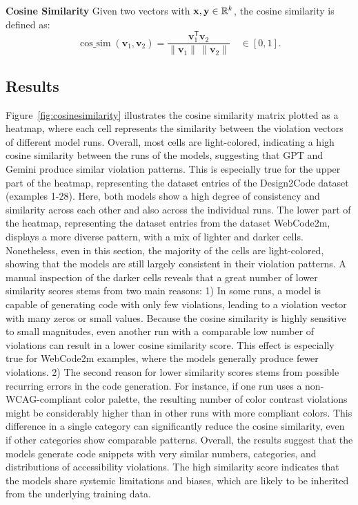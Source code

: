 \textbf{Cosine Similarity}  
  Given two vectors with $\mathbf x,\mathbf y\in\mathbb R^{k}$, the cosine similarity is defined as:
  \[
  \operatorname{cos\_sim}(\mathbf v_1,\mathbf v_2)=
  \frac{\mathbf v_1^{\mathsf T}\mathbf v_2}{\lVert \mathbf v_1\rVert\,\lVert \mathbf v_2\rVert}
  \quad\in[0,1].
\]


\subsection{Results}
Figure~\ref{fig:cosinesimilarity} illustrates the cosine similarity matrix 
plotted as a heatmap, where each cell represents the similarity between 
the violation vectors of different model runs. 
Overall, most cells 
are light-colored, indicating a high cosine similarity 
between the runs of the models, suggesting that GPT and Gemini
produce similar violation patterns.\newline
This is especially true 
for the upper part of the heatmap, representing the 
dataset entries of the Design2Code dataset (examples 1-28). 
Here, both models 
show a high degree of consistency and similarity across 
each other and also across the individual runs.
The lower part of the heatmap, representing the
dataset entries from the dataset WebCode2m, displays 
a more diverse pattern, with a mix of lighter and 
darker cells. Nonetheless, even in this section, 
the majority of the cells are light-colored, showing
that the models are still largely consistent in their violation 
patterns.\newline
A manual inspection of the darker cells reveals 
that a great number of lower similarity scores stems from 
two main reasons: 1) In some runs, a model is capable 
of generating code with only few violations, leading to 
a violation vector with many zeros or small values.
Because the cosine similarity is highly sensitive to 
small magnitudes, even another run with a comparable low
number of violations can result in a lower cosine similarity score. 
This effect is especially true for WebCode2m examples, where the models generally 
produce fewer violations. 
2) The second reason for lower similarity scores stems 
from possible recurring errors in the code generation. 
For instance, if one run uses a non-WCAG-compliant color 
palette, the resulting number of color contrast violations 
might be considerably higher than in other runs with 
more compliant colors.
This difference in a single category can significantly 
reduce the cosine similarity, even if other categories
show comparable patterns.\newline 
Overall, the results suggest that the models generate 
code snippets with very similar numbers, 
categories, and distributions of accessibility violations. 
The high similarity score indicates that the models share systemic
limitations and biases, which are likely to be inherited 
from the underlying training data.

